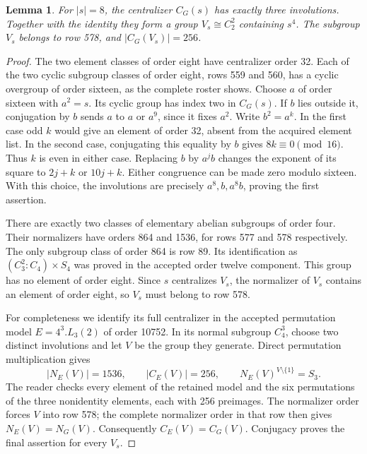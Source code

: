 \documentclass[11pt,a4paper]{article}
\newtheorem{lemma}{Lemma}\newtheorem{theorem}{Theorem}
\begin{document}
\begin{lemma}\label{three}
For $|s|=8$, the centralizer $C_G(s)$ has exactly three involutions.
Together with the identity they form a group $V_s\cong C_2^2$ containing
$s^4$. The subgroup $V_s$ belongs to row 578, and $|C_G(V_s)|=256$.
\end{lemma}
\begin{proof}
The two element classes of order eight have centralizer order 32.
Each of the two cyclic subgroup classes of order eight, rows 559 and 560,
has a cyclic overgroup of order sixteen, as the complete roster shows.
Choose $a$ of order sixteen with $a^2=s$. Its cyclic group has index two
in $C_G(s)$. If $b$ lies outside it, conjugation by $b$ sends $a$ to $a$
or $a^9$, since it fixes $a^2$. Write $b^2=a^k$. In the first case odd
$k$ would give an element of order 32, absent from the acquired element
list. In the second case, conjugating this equality by $b$ gives
$8k\equiv0\pmod {16}$. Thus $k$ is even in either case. Replacing $b$
by $a^jb$ changes the exponent of its square to $2j+k$ or $10j+k$.
Either congruence can be made zero modulo sixteen. With this choice,
the involutions are precisely $a^8,b,a^8b$, proving the first assertion.

There are exactly two classes of elementary abelian subgroups of order
four. Their normalizers have orders 864 and 1536, for rows 577 and 578
respectively. The only subgroup class of order 864 is row 89. Its
identification as $(C_3^2:C_4)\times S_4$ was proved in the accepted
order twelve component. This group has no element of order eight.
Since $s$ centralizes $V_s$, the normalizer of $V_s$ contains an element
of order eight, so $V_s$ must belong to row 578.

For completeness we identify its full centralizer in the accepted
permutation model $E=4^3.L_3(2)$ of order 10752. In its normal subgroup
$C_4^3$, choose two distinct involutions and let $V$ be the group they
generate. Direct permutation multiplication gives
\[
 |N_E(V)|=1536,\qquad |C_E(V)|=256,
 \qquad N_E(V)^{V\setminus\{1\}}=S_3.                      \tag{2}
\]
The reader checks every element of the retained model and the six
permutations of the three nonidentity elements, each with 256 preimages.
The normalizer order forces $V$ into row 578; the complete normalizer
order in that row then gives $N_E(V)=N_G(V)$. Consequently
$C_E(V)=C_G(V)$. Conjugacy proves the final assertion for every $V_s$.
\end{proof}
\end{document}
